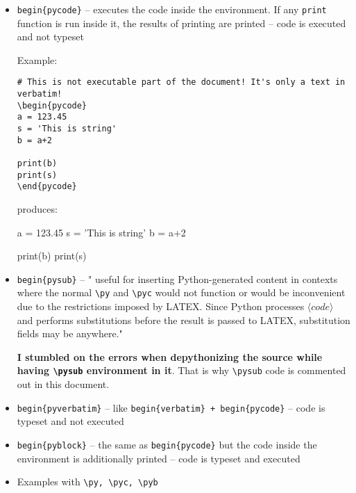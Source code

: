 \documentclass[11pt]{article}
\begin{document}
\begin{itemize}

\item 
\verb|begin{pycode}| -- executes the code inside the environment. If any \verb|print| function is run inside it, the results of printing are printed 
-- code is executed and not typeset

Example:

\begin{verbatim}
# This is not executable part of the document! It's only a text in verbatim!
\begin{pycode}
a = 123.45
s = 'This is string'
b = a+2

print(b)
print(s)
\end{pycode}
\end{verbatim}

produces:

\begin{pycode}
a = 123.45
s = 'This is string'
b = a+2

print(b)
print(s)
\end{pycode}


\item 
\verb|begin{pysub}| -- " useful for inserting Python-generated content in contexts where the normal \verb|\py| and \verb|\pyc| would not function or would be inconvenient due to the restrictions imposed by LATEX. Since Python processes $\langle code \rangle$ and performs substitutions before the result is passed to LATEX, substitution fields may be anywhere."

{\bf I stumbled on the errors when depythonizing the source while having \verb|\pysub| environment in it}. That is why \verb|\pysub| code is commented out in this document.

%
%

\item 
\verb|begin{pyverbatim}| -- like \verb|begin{verbatim} + begin{pycode}| -- code is typeset and not executed

\item 
\verb|begin{pyblock}| -- the same as \verb|begin{pycode}| but the code inside the environment is additionally printed 
-- code is typeset and executed

\item Examples with \verb|\py, \pyc, \pyb| 


\end{itemize}
\end{document}
